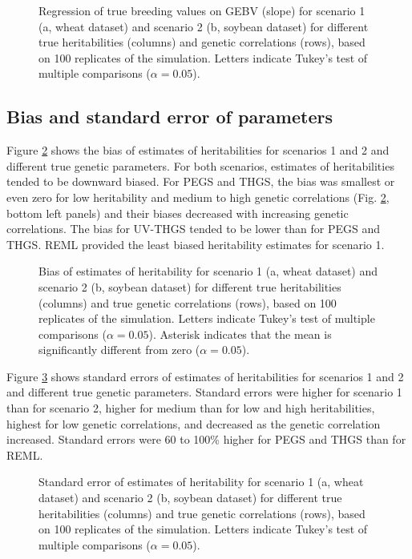 \documentclass{bmcart}
\def\texttt{[image: ]}
\begin{document}
\begin{figure}[ht]
  \caption{\small{Regression of true breeding values on GEBV (slope) for scenario 1 (a, wheat dataset) and scenario 2 (b, soybean dataset) for different true heritabilities (columns) and genetic correlations (rows), based on 100 replicates of the simulation. Letters indicate Tukey's test of multiple comparisons ($\alpha=0.05$).}}
  \label{Slope}
\end{figure}

\subsection{Bias and standard error of parameters}

Figure \ref{FigBiasH2} shows the bias of estimates of heritabilities for scenarios 1 and 2 and different true genetic parameters. For both scenarios, estimates of heritabilities tended to be downward biased. For PEGS and THGS, the bias was smallest or even zero for low heritability and medium to high genetic correlations (Fig. \ref{FigBiasH2}, bottom left panels) and their biases decreased with increasing genetic correlations. The bias for UV-THGS tended to be lower than for PEGS and THGS. REML provided the least biased heritability estimates for scenario 1. 

\begin{figure}%
  \caption{\small{Bias of estimates of heritability for scenario 1 (a, wheat dataset) and scenario 2 (b, soybean dataset) for different true heritabilities (columns) and true genetic correlations (rows), based on 100 replicates of the simulation. Letters indicate Tukey's test  of multiple comparisons ($\alpha=0.05$). Asterisk indicates that the mean is significantly different from zero ($\alpha=0.05$).}}
  \label{FigBiasH2}
\end{figure}

Figure \ref{FigPrecH2} shows standard errors of estimates of heritabilities for scenarios 1 and 2 and different true genetic parameters. Standard errors were higher for scenario 1 than for scenario 2, higher for medium than for low and high heritabilities, highest for low genetic correlations, and decreased as the genetic correlation increased. Standard errors were 60 to 100\% higher for PEGS and THGS than for REML.

\begin{figure}%
  \caption{\small{Standard error of estimates of heritability for scenario 1 (a, wheat dataset) and scenario 2 (b, soybean dataset) for different true heritabilities (columns) and true genetic correlations (rows), based on 100 replicates of the simulation. Letters indicate Tukey's test of multiple comparisons ($\alpha=0.05$).}}
  \label{FigPrecH2}
\end{figure}
\end{document}
